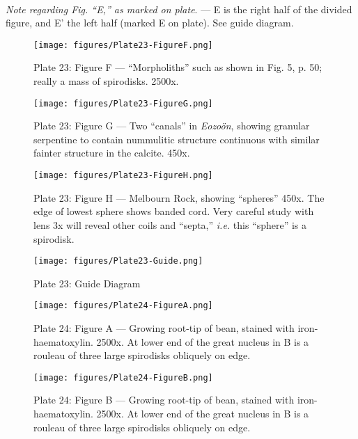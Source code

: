\documentclass[a4paper, 12pt, oneside]{article}
\begin{document}
\paragraph{}
\emph{Note regarding Fig. ``E,'' as marked on plate}. --- E is the right half of the divided figure, and E' the left half (marked E on plate). See guide diagram.
\clearpage
\begin{figure}[b]
\centering
\texttt{[image: figures/Plate23-FigureF.png]}
\caption{\small Plate 23: Figure F --- ``Morpholiths'' such as shown in Fig. 5, p. 50; really a mass of spirodisks. 2500x.}
\end{figure}
\clearpage
\begin{figure}[b]
\centering
\texttt{[image: figures/Plate23-FigureG.png]}
\caption{\small Plate 23: Figure G --- Two ``canals'' in \emph{Eozoön}, showing granular serpentine to contain nummulitic structure continuous with similar fainter structure in the calcite. 450x.}
\end{figure}
\clearpage
\begin{figure}[b]
\centering
\texttt{[image: figures/Plate23-FigureH.png]}
\caption{\small Plate 23: Figure H --- Melbourn Rock, showing ``spheres'' 450x. The edge of lowest sphere shows banded cord. Very careful study with lens 3x will reveal other coils and ``septa,'' \emph{i.e.} this ``sphere'' is a spirodisk.}
\end{figure}
\clearpage
\begin{figure}[b]
\centering
\texttt{[image: figures/Plate23-Guide.png]}
\caption{\small Plate 23: Guide Diagram}
\end{figure}
\clearpage
{}
\cfoot{\thepage}
\begin{figure}[b]
\centering
\texttt{[image: figures/Plate24-FigureA.png]}
\caption{\small Plate 24: Figure A --- Growing root-tip of bean, stained with iron-haematoxylin. 2500x. At lower end of the great nucleus in B is a rouleau of three large spirodisks obliquely on edge.}
\end{figure}
\clearpage
\begin{figure}[b]
\centering
\texttt{[image: figures/Plate24-FigureB.png]}
\caption{\small Plate 24: Figure B --- Growing root-tip of bean, stained with iron-haematoxylin. 2500x. At lower end of the great nucleus in B is a rouleau of three large spirodisks obliquely on edge.}
\end{figure}
\end{document}

